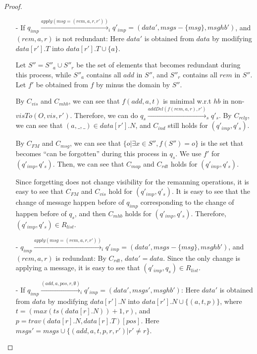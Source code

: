 \begin {proof}
\begin{itemize}
\item[-] If $q_{\mathit{imp}} \xrightarrow{\mathit{apply}( \mathit{msg}=( \mathit{rem},a,r,r' ))}_i q'_{\mathit{imp}} = (\mathit{data}',\mathit{msgs} - \{ \mathit{msg} \},\mathit{msghb}')$, and $(\mathit{rem},a,r)$ is not redundant: Here $\mathit{data}'$ is obtained from $\mathit{data}$ by modifying $\mathit{data}[r'].T$ into $\mathit{data}[r'].T \cup \{ a \}$.

    Let $S'' = S''_a \cup S''_r$ be the set of elements that becomes redundant during this process, while $S''_a$ contains all $\mathit{add}$ in $S''$, and $S''_r$ contains all $\mathit{rem}$ in $S''$. Let $f'$ be obtained from $f$ by minus the domain by $S''$.

    By $C_{\mathit{vis}}$ and $C_{\mathit{mhb}}$, we can see that $f(\mathit{add},a,t)$ is minimal w.r.t $\mathit{hb}$ in non-$\mathit{visTo}(O,\mathit{vis},r')$. Therefore, we can do $q_s \xrightarrow{ \mathit{addDel}( f(\mathit{rem},a,r),r' )}_s q'_s$. By $C_{\mathit{rely}}$, we can see that $(a,\_,\_) \in \mathit{data}[r'].N$, and $C_{\mathit{ind}}$ still holds for $(q'_{\mathit{imp}},q'_s)$.

    By $C_{\mathit{FM}}$ and $C_{\mathit{msg}}$, we can see that $\{ o \vert \exists x \in S'', f(S'') = o \}$ is the set that becomes ``can be forgotten'' during this process in $q_s$. We use $f'$ for $(q'_{\mathit{imp}},q'_s)$. Then, we can see that $C_{\mathit{map}}$ and $C_{\mathit{rdt}}$ holds for $(q'_{\mathit{imp}},q'_s)$.

    Since forgetting does not change visibility for the remanning operations, it is easy to see that $C_{\mathit{FM}}$ and $C_{\mathit{vis}}$ hold for $(q'_{\mathit{imp}},q'_s)$. It is easy to see that the change of message happen before of $q_{\mathit{imp}}$ corresponding to the change of happen before of $q_s$, and then $C_{\mathit{mhb}}$ holds for $(q'_{\mathit{imp}},q'_s)$. Therefore, $(q'_{\mathit{imp}},q'_s) \in R_{\mathit{list}}$.

\item[-] $q_{\mathit{imp}} \xrightarrow{\mathit{apply}( \mathit{msg}=( \mathit{rem},a,r,r' ))}_i q'_{\mathit{imp}} = (\mathit{data}',\mathit{msgs} - \{ \mathit{msg} \},\mathit{msghb}')$, and $(\mathit{rem},a,r)$ is redundant: By $C_{\mathit{rdt}}$, $\mathit{data}' = \mathit{data}$. Since the only change is applying a message, it is easy to see that $(q'_{\mathit{imp}},q_s) \in R_{\mathit{list}}$.

\item[-] If $q_{\mathit{imp}} \xrightarrow{(\mathit{add},a,\mathit{pos},r,\emptyset)}_i q'_{\mathit{imp}} = (\mathit{data}',\mathit{msgs}',\mathit{msghb}')$: Here $\mathit{data}'$ is obtained from $\mathit{data}$ by modifying $\mathit{data}[r'].N$ into $\mathit{data}[r'].N \cup \{ (a,t,p) \}$, where $t=(\mathit{max}(\mathit{ts}(\mathit{data}[r].N))+1,r)$, and $p = \mathit{trav}(\mathit{data}[r].N,\mathit{data}[r].T)[\mathit{pos}]$. Here $\mathit{msgs}' = \mathit{msgs} \cup \{ (\mathit{add},a,t,p,r,r') \vert r' \neq r \}$.


\end{itemize}
\end{proof}
